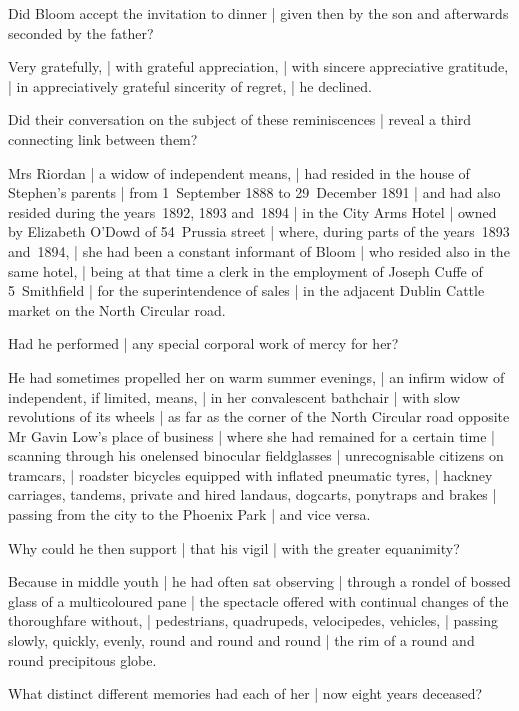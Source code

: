 Did Bloom accept the invitation to dinner |
given then by the son and afterwards seconded by the father?

\Bloom
Very gratefully, |
with grateful appreciation, |
with sincere appreciative gratitude, |
in appreciatively grateful sincerity of regret, |
he declined.


Did their conversation on the subject of these reminiscences |
reveal a third connecting link between them?

\Places
Mrs Riordan
 |
a widow of independent means, |
had resided in the house of Stephen's parents |
from 1~September 1888 to 29~December 1891 |
and had also resided during the years~1892, 1893 and~1894 |
in the City Arms Hotel |
owned by Elizabeth O'Dowd of 54~Prussia street |
where, during parts of the years~1893 and~1894, |
she had been a constant informant of Bloom |
who resided also in the same hotel, |
being at that time a clerk
in the employment of Joseph Cuffe of 5~Smithfield |
for the superintendence of sales |
in the adjacent Dublin Cattle market on the North Circular road.


Had he performed |
any special corporal work of mercy for her?

\Memories
He had sometimes propelled her on warm summer evenings, |
an infirm widow of independent, if limited, means, |
in her convalescent bathchair |
with slow revolutions of its wheels |
as far as the corner of the North Circular road
opposite Mr Gavin Low's place of business |
where she had remained for a certain time |
scanning through his onelensed binocular fieldglasses |
unrecognisable citizens on tramcars, |
roadster bicycles equipped with inflated pneumatic tyres, |
hackney carriages, tandems, private and hired landaus, dogcarts, ponytraps and brakes |
passing from the city to the Phoenix Park |
and vice versa.


Why could he then support |
that his vigil |
with the greater equanimity?

\Memories
Because in middle youth |
he had often sat observing |
through a rondel of bossed glass of a multicoloured pane |
the spectacle offered with continual changes of the thoroughfare without, |
pedestrians, quadrupeds, velocipedes, vehicles, |
passing slowly, quickly, evenly, round and round and round |
the rim of a round and round precipitous globe.


What distinct different memories had each of her |
now eight years deceased?


